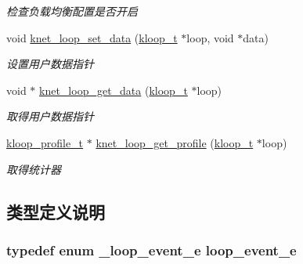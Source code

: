 \begin{DoxyCompactItemize}
\begin{DoxyCompactList}\small\item\em 检查负载均衡配置是否开启 \end{DoxyCompactList}\item 
void \hyperlink{a00117_gaf1239ea65307d7dc588175c45947437b_gaf1239ea65307d7dc588175c45947437b}{knet\+\_\+loop\+\_\+set\+\_\+data} (\hyperlink{a00056_a97fc76209a58362019f1ded9169e397f_a97fc76209a58362019f1ded9169e397f}{kloop\+\_\+t} $\ast$loop, void $\ast$data)
\begin{DoxyCompactList}\small\item\em 设置用户数据指针 \end{DoxyCompactList}\item 
void $\ast$ \hyperlink{a00076_a408e38fd57e572c9f9fd70d729663495_a408e38fd57e572c9f9fd70d729663495}{knet\+\_\+loop\+\_\+get\+\_\+data} (\hyperlink{a00056_a97fc76209a58362019f1ded9169e397f_a97fc76209a58362019f1ded9169e397f}{kloop\+\_\+t} $\ast$loop)
\begin{DoxyCompactList}\small\item\em 取得用户数据指针 \end{DoxyCompactList}\item 
\hyperlink{a00056_ab75a5c23099a6118c469ed160b277f28_ab75a5c23099a6118c469ed160b277f28}{kloop\+\_\+profile\+\_\+t} $\ast$ \hyperlink{a00117_gafc6a946f7c7fd4fb0508ac0f88969da1_gafc6a946f7c7fd4fb0508ac0f88969da1}{knet\+\_\+loop\+\_\+get\+\_\+profile} (\hyperlink{a00056_a97fc76209a58362019f1ded9169e397f_a97fc76209a58362019f1ded9169e397f}{kloop\+\_\+t} $\ast$loop)
\begin{DoxyCompactList}\small\item\em 取得统计器 \end{DoxyCompactList}\end{DoxyCompactItemize}


\subsection{类型定义说明}
\hypertarget{a00076_ab92fe4e788615cfd56530167651a8ff4_ab92fe4e788615cfd56530167651a8ff4}{}
\subsubsection[{loop\+\_\+event\+\_\+e}]{\setlength{\rightskip}{0pt plus 5cm}typedef enum {\bf \+\_\+loop\+\_\+event\+\_\+e}  {\bf loop\+\_\+event\+\_\+e}}\label{a00076_ab92fe4e788615cfd56530167651a8ff4_ab92fe4e788615cfd56530167651a8ff4}
\hypertarget{a00076_a1095ee772017ce29dcac0987c456709e_a1095ee772017ce29dcac0987c456709e}{}

